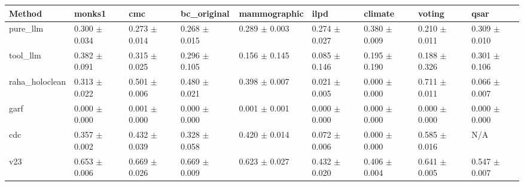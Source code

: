\begin{tabular}{lllllllll}
\hline
Method & monks1 & cmc & bc_original & mammographic & ilpd & climate & voting & qsar \\
\hline
pure\_llm & 0.300 $\pm$ 0.034 & 0.273 $\pm$ 0.014 & 0.268 $\pm$ 0.015 & 0.289 $\pm$ 0.003 & 0.274 $\pm$ 0.027 & 0.380 $\pm$ 0.009 & 0.210 $\pm$ 0.011 & 0.309 $\pm$ 0.010 \\
tool\_llm & 0.382 $\pm$ 0.091 & 0.315 $\pm$ 0.025 & 0.296 $\pm$ 0.105 & 0.156 $\pm$ 0.145 & 0.085 $\pm$ 0.146 & 0.195 $\pm$ 0.190 & 0.188 $\pm$ 0.326 & 0.301 $\pm$ 0.106 \\
raha\_holoclean & 0.313 $\pm$ 0.022 & 0.501 $\pm$ 0.006 & 0.480 $\pm$ 0.021 & 0.398 $\pm$ 0.007 & 0.021 $\pm$ 0.005 & 0.000 $\pm$ 0.000 & 0.711 $\pm$ 0.011 & 0.066 $\pm$ 0.007 \\
garf & 0.000 $\pm$ 0.000 & 0.001 $\pm$ 0.000 & 0.000 $\pm$ 0.000 & 0.001 $\pm$ 0.001 & 0.000 $\pm$ 0.000 & 0.000 $\pm$ 0.000 & 0.000 $\pm$ 0.000 & 0.000 $\pm$ 0.000 \\
cdc & 0.357 $\pm$ 0.002 & 0.432 $\pm$ 0.039 & 0.328 $\pm$ 0.058 & 0.420 $\pm$ 0.014 & 0.072 $\pm$ 0.006 & 0.000 $\pm$ 0.000 & 0.585 $\pm$ 0.016 & N/A \\
v23 & 0.653 $\pm$ 0.006 & 0.669 $\pm$ 0.026 & 0.669 $\pm$ 0.009 & 0.623 $\pm$ 0.027 & 0.432 $\pm$ 0.020 & 0.406 $\pm$ 0.004 & 0.641 $\pm$ 0.005 & 0.547 $\pm$ 0.007 \\
\hline
\end{tabular}
